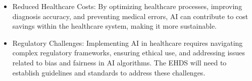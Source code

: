 \begin{itemize}
\item Reduced Healthcare Costs: By optimizing healthcare processes, improving diagnosis accuracy, and preventing medical errors, AI can contribute to cost savings within the healthcare system, making it more sustainable.

\item Regulatory Challenges: Implementing AI in healthcare requires navigating complex regulatory frameworks, ensuring ethical use, and addressing issues related to bias and fairness in AI algorithms. The EHDS will need to establish guidelines and standards to address these challenges.

\end{itemize}


